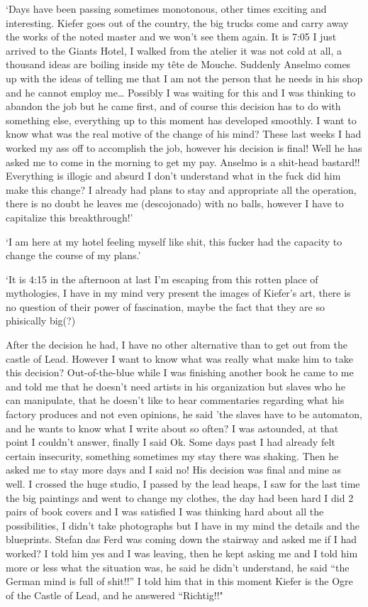 \documentclass[smalldemyvopaper,11pt,twoside,onecolumn,openright,extrafontsizes]{memoir}
\begin{document}
\ornamentbreak

‘Days have been passing sometimes monotonous, other times exciting and interesting. Kiefer goes out of the country, the big trucks come and carry away the works of the noted master and we won’t see them again. It is 7:05 I just arrived to the Giants Hotel, I walked from the atelier it was not cold at all, a thousand ideas are boiling inside my tête de Mouche. Suddenly Anselmo comes up with the ideas of telling me that I am not the person that he needs in his shop and he cannot employ me… Possibly I was waiting for this and I was thinking to abandon the job but he came first, and of course this decision has to do with something else, everything up to this moment has developed smoothly. I want to know what was the real motive of the change of his mind? These last weeks I had worked my ass off to accomplish the job, however his decision is final! Well he has asked me to come in the morning to get my pay. Anselmo is a shit-head bastard!! Everything is illogic and absurd I don’t understand what in the fuck did him make this change? I already had plans to stay and appropriate all the operation, there is no doubt he leaves me (descojonado) with no balls, however I have to capitalize this breakthrough!’

\ornamentbreak

‘I am here at my hotel feeling myself like shit, this fucker had the capacity to change the course of my plans.’

\ornamentbreak

‘It is 4:15 in the afternoon at last I’m escaping from this rotten place of mythologies, I have in my mind very present the images of Kiefer’s art, there is no question of their power of fascination, maybe the fact that they are so phisically big(?) 

After the decision he had, I have no other alternative than to get out from the castle of Lead. However I want to know what was really what make him to take this decision? Out-of-the-blue while I was finishing another book he came to me and told me that he doesn’t need artists in his organization but slaves who he can manipulate, that he doesn’t like to hear commentaries regarding what his factory produces and not even opinions, he said 'the slaves have to be automaton, and he wants to know what I write about so often? I was astounded, at that point I couldn’t answer, finally I said Ok. Some days past I had already felt certain insecurity, something sometimes my stay there was shaking. Then he asked me to stay more days and I said no! His decision was final and mine as well. I crossed the huge studio, I passed by the lead heaps, I saw for the last time the big paintings and went to change my clothes, the day had been hard I did 2 pairs of book covers and I was satisfied I was thinking hard about all the possibilities, I didn’t take photographs but I have in my mind the details and the blueprints. Stefan das Ferd was coming down the stairway and asked me if I had worked? I told him yes and I was leaving, then he kept asking me and I told him more or less what the situation was, he said he didn’t understand, he said “the German mind is full of shit!!” I told him that in this moment Kiefer is the Ogre of the Castle of Lead, and he answered “Richtig!!"
\end{document}

